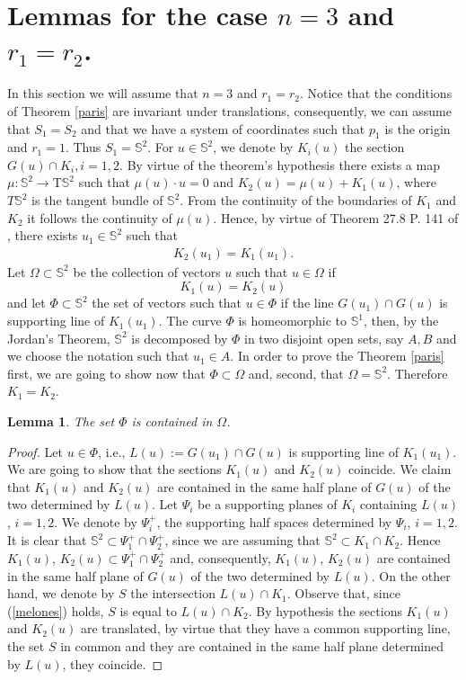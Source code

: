 \documentclass[12pt]{amsart}
\newtheorem{lemma}{Lemma}
\begin{document}
\section{Lemmas for the case $n=3$ and $r_1=r_2$.}  
In this section we will assume that $n=3$ and $r_1=r_2$. Notice that the conditions of Theorem \ref{paris} are invariant under translations, consequently, we can assume that $S_1=S_2$ and that we have a system of coordinates such that $p_1$ is the origin and $r_1=1$. Thus $S_1=\mathbb{S}^2$. For $u\in \mathbb{S}^{2}$, we denote by $K_i (u)$ the section $G(u)\cap K_i, i=1,2$. By virtue of the theorem's hypothesis there exists a map $\mu: \mathbb{S}^2 \rightarrow \textrm{T} \mathbb{S}^2$ such that $\mu(u) \cdot u=0$ and $K_2 (u)= \mu(u)+K_1(u)$, where $T \mathbb{S}^2$ is the tangent bundle of $\mathbb{S}^2$.
From the continuity of the boundaries of $K_1$ and $K_2$ it follows the continuity of $\mu(u)$. Hence, by virtue of Theorem 27.8 P. 141 of \cite{steenrod},  there exists $u_1\in \mathbb{S}^2$ such that
\begin{eqnarray}\label{melones}
K_2 (u_1)= K_1(u_1).
\end{eqnarray}
Let $\Omega \subset \mathbb{S}^2$ be the collection of vectors $u$ such that $u\in \Omega $ if 
\[
K_1(u)= K_2(u)
\]
and let $\Phi \subset \mathbb{S}^2$ the set of vectors such that 
$u\in \Phi$ if the line $G(u_1)\cap G(u)$ is supporting line of $K_1(u_1)$. The curve $\Phi$ is homeomorphic to $\mathbb{S}^1$, then, by the Jordan's Theorem,  $\mathbb{S}^2$ is decomposed by $\Phi$ in two disjoint open sets, say $A,B$ and we choose the notation such that $u_1\in A$. In order to prove the Theorem \ref{paris} first, we are going to show now that $\Phi \subset \Omega$ and, second, that  $\Omega = \mathbb{S}^2$. Therefore $K_1=K_2$. 
\begin{lemma}\label{caboe} 
The set $\Phi$ is contained in  $\Omega$. 
\end{lemma}
\begin{proof}
Let $u\in \Phi$, i.e., $L(u):=G(u_1)\cap G(u)$ is supporting line of $K_1(u_1)$. We are going to show that the sections $K_1(u)$ and $K_2(u)$ coincide. We claim that $K_1(u)$ and $K_2(u)$ are contained in the same half plane of $G(u)$ of the two determined by $L(u)$. Let $\Psi_i$ be a supporting planes of $K_i$  containing $L(u)$, $i=1,2$. We denote by $\Psi^{+}_i$, the  supporting half spaces determined by $\Psi_i$, $i=1,2$. It is clear that $\mathbb{S}^2 \subset \Psi^{+}_1 \cap \Psi^{+}_2$, since we are assuming that $\mathbb{S}^2 \subset K_1  \cap K_2$. Hence $K_1(u)$, $ K_2(u) \subset \Psi^{+}_1 \cap \Psi^{+}_2$ and, consequently, $K_1(u)$, $K_2(u)$ are contained in the same half plane of $G(u)$ of the two determined by $L(u)$. On the other hand, we denote by $S$ the intersection $L(u) \cap   K_1$. Observe that, since (\ref{melones}) holds, $S$ is equal to $L(u) \cap   K_2$. By hypothesis the sections $K_1(u)$ and $ K_2(u)$ are translated, by virtue that they have a common supporting line, the set $S$ in common and they are contained in the same half plane determined by $L(u)$, they coincide.
\end{proof}  
\end{document}
